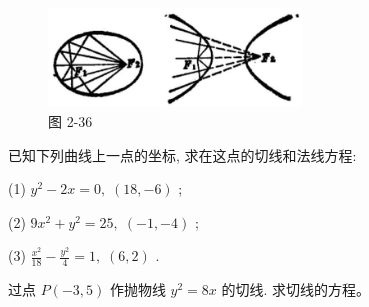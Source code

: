 \documentclass[lang=cn,newtx,10pt,scheme=chinese]{elegantbook}
\begin{document}
\begin{figure}[h]
  \centering
  \includegraphics[max width=0.6\textwidth]{images/01912cc2-ffb6-728e-9ae7-b113ff05c64b_124_448954.jpg}
  \caption{图 2-36}
\end{figure}



\begin{problemset}[练习]

\item 已知下列曲线上一点的坐标, 求在这点的切线和法线方程:

(1) \({y}^{2} - {2x} = 0,\;\left( {{18}, - 6}\right)\) ;

(2) \(9{x}^{2} + {y}^{2} = {25},\;\left( {-1, - 4}\right)\) ;

(3) \(\frac{{x}^{2}}{18} - \frac{{y}^{2}}{4} = 1,\;\left( {6,2}\right)\) .

\item 过点 \(P\left( {-3,5}\right)\) 作抛物线 \({y}^{2} = {8x}\) 的切线. 求切线的方程。

\end{problemset}
\end{document}
